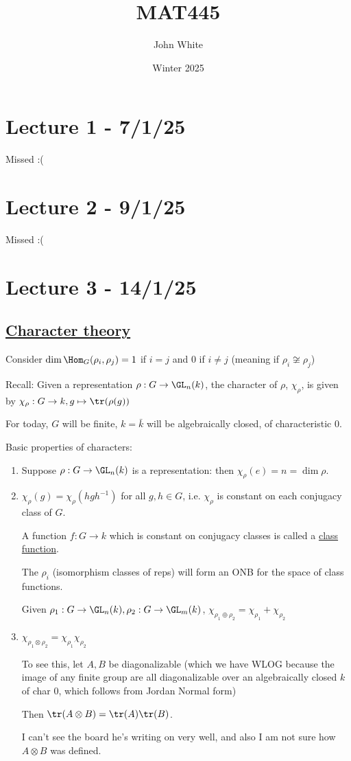 \documentclass[x11names,reqno,14pt]{extarticle}
\title{MAT445}
\author{John White}
\date{Winter 2025}
\begin{document}
\section*{Lecture 1 - 7/1/25}

Missed :(

\section*{Lecture 2 - 9/1/25}

Missed :(

\section*{Lecture 3 - 14/1/25}

\subsection*{\underline{Character theory}}

Consider $\dim\Hom_G(\rho_i,\rho_j) = 1$ if $i = j$ and $0$ if $i \neq j$ (meaning if $\rho_i\not\cong\rho_j$)

Recall: Given a representation $\rho:G\to \GL_n(k)$, the character of $\rho$, $\chi_\rho$, is given by $\chi_\rho:G\to k, g \mapsto \tr(\rho(g))$

For today, $G$ will be finite, $k = \bar{k}$ will be algebraically closed, of characteristic 0. 

Basic properties of characters: 
\begin{enumerate}

\item Suppose $\rho:G\to\GL_n(k)$ is a representation: then $\chi_\rho(e) = n = \dim \rho$. 

\item $\chi_\rho(g) = \chi_\rho(hgh^{-1})$ for all $g, h \in G$, i.e. $\chi_\rho$ is constant on each conjugacy class of $G$. 


A function $f:G\to k$ which is constant on conjugacy classes is called a \underline{class function}. 

The $\rho_i$ (isomorphism classes of reps) will form an ONB for the space of class functions.  

Given $\rho_1:G\to \GL_n(k), \rho_2:G\to \GL_m(k)$, $\chi_{\rho_1\oplus\rho_2} = \chi_{\rho_1} + \chi_{\rho_2}$

\item $\chi_{\rho_1\otimes\rho_2} = \chi_{\rho_1}\chi_{\rho_2}$

To see this, let $A, B$ be diagonalizable (which we have WLOG because the image of any finite group are all diagonalizable over an algebraically closed $k$ of char 0, which follows from Jordan Normal form)

Then $\tr(A\otimes B)=\tr(A)\tr(B)$. 

I can't see the board he's writing on very well, and also I am not sure how $A\otimes B$ was defined. 

\end{enumerate}
\end{document}
